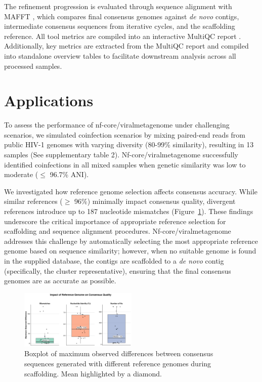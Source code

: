 The refinement progression is evaluated through sequence alignment with MAFFT \cite{Katoh2002-ox}, which compares final consensus genomes against \textit{de novo} contigs, intermediate consensus sequences from iterative cycles, and the scaffolding reference. All tool metrics are compiled into an interactive MultiQC report \cite{Ewels2016-hs}. Additionally, key metrics are extracted from the MultiQC report and compiled into standalone overview tables to facilitate downstream analysis across all processed samples.

\section{Applications}

To assess the performance of nf-core/viralmetagenome under challenging scenarios, we simulated coinfection scenarios by mixing paired-end reads from public HIV-1 genomes with varying diversity (80-99\% similarity), resulting in 13 samples (See supplementary table 2). Nf-core/viralmetagenome successfully identified coinfections in all mixed samples when genetic similarity was low to moderate ($\leq$ 96.7\% ANI).

We investigated how reference genome selection affects consensus accuracy. While similar references ($\geq$ 96\%) minimally impact consensus quality, divergent references introduce up to 187 nucleotide mismatches (Figure~\ref{fig:reference-influence}). These findings underscore the critical importance of appropriate reference selection for scaffolding and sequence alignment procedures. Nf-core/viralmetagenome addresses this challenge by automatically selecting the most appropriate reference genome based on sequence similarity; however, when no suitable genome is found in the supplied database, the contigs are scaffolded to a \textit{de novo} contig (specifically, the cluster representative), ensuring that the final consensus genomes are as accurate as possible.

\begin{figure}[htbp]
    \centering
    \includegraphics[width=0.5\textwidth]{Fig/fig2.png}
    \caption{Boxplot of maximum observed differences between consensus sequences generated with different reference genomes during scaffolding. Mean highlighted by a diamond.}
    \label{fig:reference-influence}
\end{figure}

